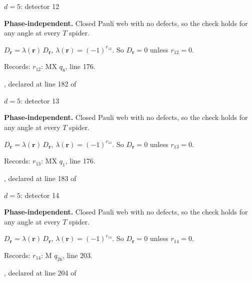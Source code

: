 \label{d5_det012}
{\Large $d=5$: detector 12}\par
\textbf{Phase-independent.} Closed Pauli web with no defects, so the check holds for any angle at every $T$ spider.
\begin{center}
\end{center}
\vspace{-1mm}
$D_{\boldsymbol r}=\lambda(\boldsymbol r)\,D_{\boldsymbol r}$, \quad $\lambda(\boldsymbol r)=(-1)^{r_{12}}$. \qquad So $D_{\boldsymbol r}=0$ unless $r_{12}=0$.
\par\smallskip\begin{minipage}{.98\linewidth}\small Records: $r_{12}$: MX $q_{8}$, line 176.\end{minipage}
\vfill
{\footnotesize\texttt{}, declared at line 182 of \texttt{}}
\newpage

\label{d5_det013}
{\Large $d=5$: detector 13}\par
\textbf{Phase-independent.} Closed Pauli web with no defects, so the check holds for any angle at every $T$ spider.
\begin{center}
\end{center}
\vspace{-1mm}
$D_{\boldsymbol r}=\lambda(\boldsymbol r)\,D_{\boldsymbol r}$, \quad $\lambda(\boldsymbol r)=(-1)^{r_{13}}$. \qquad So $D_{\boldsymbol r}=0$ unless $r_{13}=0$.
\par\smallskip\begin{minipage}{.98\linewidth}\small Records: $r_{13}$: MX $q_{1}$, line 176.\end{minipage}
\vfill
{\footnotesize\texttt{}, declared at line 183 of \texttt{}}
\newpage

\label{d5_det014}
{\Large $d=5$: detector 14}\par
\textbf{Phase-independent.} Closed Pauli web with no defects, so the check holds for any angle at every $T$ spider.
\begin{center}
\end{center}
\vspace{-1mm}
$D_{\boldsymbol r}=\lambda(\boldsymbol r)\,D_{\boldsymbol r}$, \quad $\lambda(\boldsymbol r)=(-1)^{r_{14}}$. \qquad So $D_{\boldsymbol r}=0$ unless $r_{14}=0$.
\par\smallskip\begin{minipage}{.98\linewidth}\small Records: $r_{14}$: M $q_{26}$, line 203.\end{minipage}
\vfill
{\footnotesize\texttt{}, declared at line 204 of \texttt{}}
\newpage

